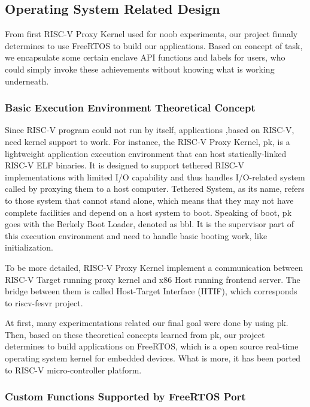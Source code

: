 \documentclass[conference]{IEEEtran}
\begin{document}

\subsection{Operating System Related Design}

From first RISC-V Proxy Kernel used for noob experiments, our project finnaly determines to use FreeRTOS to build our applications. Based on concept of task, we encapsulate some certain enclave API functions and labels for users, who could simply invoke these achievements without knowing what is working underneath. 

\subsubsection{Basic Execution Environment Theoretical Concept}

Since RISC-V program could not run by itself, applications ,based on RISC-V, need kernel support to work.  For instance, the RISC-V Proxy Kernel, pk, is a lightweight application execution environment that can host statically-linked RISC-V ELF binaries. It is designed to support tethered RISC-V implementations with limited I/O capability and thus handles I/O-related system called by proxying them to a host computer. Tethered System, as its name, refers to those system that cannot stand alone, which means that they may not have complete facilities and depend on a host system to boot. Speaking of boot, pk goes with the Berkely Boot Loader, denoted as bbl. It is the supervisor part of this execution environment and need to handle basic booting work, like initialization.

To be more detailed, RISC-V Proxy Kernel implement a communication between RISC-V Target running proxy kernel and x86 Host running frontend server. The bridge between them is called Host-Target Interface (HTIF), which corresponds to riscv-fesvr project.

At first, many experimentations related our final goal were done by using pk. Then, based on these theoretical concepts learned from pk, our project determines to build applications on FreeRTOS, which is a open source real-time operating system kernel for embedded devices. What is more, it has been ported to RISC-V micro-controller platform. 

\subsubsection{Custom Functions Supported by FreeRTOS Port}
\end{document}
